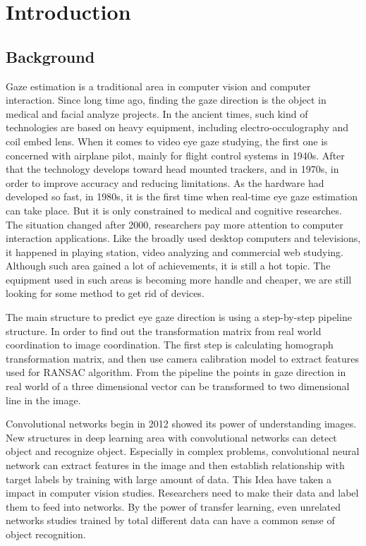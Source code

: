 \documentclass[senior]{IPSstyle}
\begin{document}
 \makepreliminarypages
 \singlespace
 \frontmatter
 \tableofcontents
 \listoffigures
 \listoftables
 \mainmatter
 \clearemptydoublepage
 \setlength{\baselineskip}{23.0pt}

\chapter{Introduction} \label{introduction}
\section{Background}

Gaze estimation is a traditional area in computer vision and computer interaction. 
Since long time ago, finding the gaze direction is the object in medical and facial analyze projects. 
In the ancient times, such kind of technologies are based on heavy equipment, including electro-occulography and coil embed lens. 
When it comes to video eye gaze studying\cite{mohamed2007history}, the first one is concerned with airplane pilot, mainly for flight control systems in 1940s. 
After that the technology develops toward head mounted trackers, and in 1970s, in order to improve accuracy and reducing limitations. 
As the hardware had developed so fast, in 1980s, it is the first time when real-time eye gaze estimation can take place. 
But it is only constrained to medical and cognitive researches\cite{borji2013state}. 
The situation changed after 2000, researchers pay more attention to computer interaction applications.
Like the broadly used desktop computers and televisions, it happened in playing station, video analyzing and commercial web studying.
Although such area gained a lot of achievements, it is still a hot topic. The equipment used in such areas is becoming more handle and cheaper, we are still looking for some method to get rid of devices.

The main structure to predict eye gaze direction is using a step-by-step pipeline structure. 
In order to find out the transformation matrix from real world coordination to image coordination.
The first step is calculating homograph transformation matrix, and then use camera calibration model to extract features used for RANSAC algorithm.
From the pipeline the points in gaze direction in real world of a three dimensional vector can be transformed to two dimensional line in the image.

Convolutional networks begin in 2012 showed its power of understanding images. 
New structures in deep learning area with convolutional networks can detect object and recognize object.
Especially in complex problems, convolutional neural network can extract features in the image and then establish relationship with target labels by training with large amount of data.
This Idea have taken a impact in computer vision studies.
Researchers need to make their data and label them to feed into networks.
By the power of transfer learning, even unrelated networks studies trained by total different data can have a common sense of object recognition.
\end{document}
